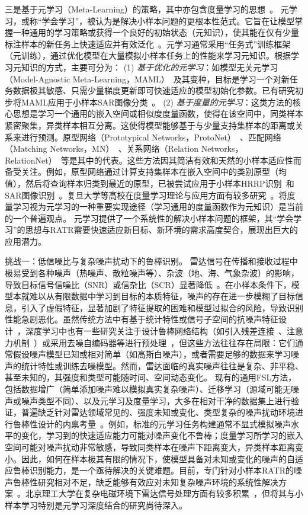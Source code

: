 {{三是基于元学习（Meta-Learning）的策略，其中亦包含度量学习的思想~\cite{X,X}。} {元学习，或称“学会学习”，被认为是解决小样本问题的更根本性范式。它旨在让模型掌握一种通用的学习策略或获得一个良好的初始状态（元知识），使其能在仅有少量标注样本的新任务上快速适应并有效泛化~\cite{X}。元学习通常采用“任务式”训练框架（元训练），通过优化模型在大量模拟小样本任务上的性能来学习元知识。根据学习元知识的方式，主要可分为：
(1) \emph{基于优化的元学习}：如模型无关元学习（Model-Agnostic Meta-Learning，MAML）~\cite{X}及其变种，目标是学习一个对新任务数据极其敏感、只需少量梯度更新即可快速适应的模型初始化参数。已有研究初步将MAML应用于小样本SAR图像分类~\cite{X}。
(2) \emph{基于度量的元学习}：这类方法的核心思想是学习一个通用的嵌入空间或相似度度量函数，使得在该空间中，同类样本紧密聚集，异类样本相互分离。这使得模型能够基于与少量支持集样本的距离或关系来进行预测。原型网络（Prototypical Networks，ProtoNet）~\cite{X}、匹配网络（Matching Networks，MN）~\cite{X}、关系网络（Relation Networks，RelationNet）~\cite{X}等是其中的代表。这些方法因其简洁有效和天然的小样本适应性而备受关注。例如，原型网络通过计算支持集样本在嵌入空间中的类别原型（均值），然后将查询样本归类到最近的原型，已被尝试应用于小样本HRRP识别~\cite{X}和SAR图像识别~\cite{X}。复旦大学等高校在度量学习理论与应用方面有较多研究~\cite{X}。将度量学习视为元学习的一种重要实现途径（学习通用的度量函数作为元知识）是当前的一个普遍观点。
元学习提供了一个系统性的解决小样本问题的框架，其“学会学习”的思想与RATR需要快速适应新目标、新环境的需求高度契合，展现出巨大的应用潜力。}

{挑战一：低信噪比与复杂噪声扰动下的鲁棒识别。}
雷达信号在传播和接收过程中极易受到各种噪声（热噪声、散粒噪声等）、杂波（地、海、气象杂波）的影响，导致目标信号信噪比（SNR）或信杂比（SCR）显著降低~\cite{X}。在小样本条件下，模型本就难以从有限数据中学习到目标的本质特征，噪声的存在进一步模糊了目标信息，引入了虚假特征，显著加剧了特征提取的困难和模型过拟合的风险，导致识别性能急剧恶化。虽然传统方法中有基于统计特性或信号子空间的抗噪声特征设计~\cite{X}，深度学习中也有一些研究关注于设计鲁棒网络结构（如引入残差连接~\cite{X}、注意力机制~\cite{X}）或采用去噪自编码器等进行预处理~\cite{X}，但这些方法往往存在局限：它们通常假设噪声模型已知或相对简单（如高斯白噪声），或者需要足够的数据来学习噪声的统计特性或训练去噪模型。然而，雷达面临的真实噪声往往是复杂、非平稳、甚至未知的，其强度和类型可能随时间、空间动态变化。
现有的通用FSL方法，包括数据增广（简单添加噪声难以模拟真实复杂噪声）、迁移学习（源域可能无噪声或噪声类型不同）、以及元学习及度量学习，大多在相对干净的数据集上进行验证，普遍缺乏针对雷达领域常见的、强度未知或变化、类型复杂的噪声扰动环境进行鲁棒性设计的内禀考量~\cite{X}。例如，标准的元学习任务构建通常不显式模拟噪声水平的变化，学习到的快速适应能力可能对噪声变化不鲁棒；度量学习所学习的嵌入空间可能对噪声扰动非常敏感，导致同类样本在噪声下距离变大，异类样本距离变小。因此，如何在{样本极其有限}的情况下，使模型具备对{未知或变化的噪声}的自适应鲁棒识别能力，是一个亟待解决的关键难题。目前，专门针对{小样本RATR的噪声鲁棒性}研究相对不足，缺乏能够有效应对未知复杂噪声环境的系统性解决方案~\cite{X}。北京理工大学在复杂电磁环境下雷达信号处理方面有较多积累~\cite{X}，但将其与小样本学习特别是元学习深度结合的研究尚待深入。

}
